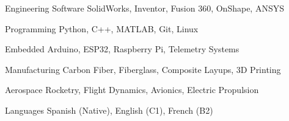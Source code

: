\cvsection{\SkillsLabel}

\cvskill
{Engineering Software}
{SolidWorks, Inventor, Fusion 360, OnShape, ANSYS}

\cvskill
{Programming}
{Python, C++, MATLAB, Git, Linux}

\cvskill
{Embedded}
{Arduino, ESP32, Raspberry Pi, Telemetry Systems}

\cvskill
{Manufacturing}
{Carbon Fiber, Fiberglass, Composite Layups, 3D Printing}

\cvskill
{Aerospace}
{Rocketry, Flight Dynamics, Avionics, Electric Propulsion}

\cvskill
{Languages}
{Spanish (Native), English (C1), French (B2)}